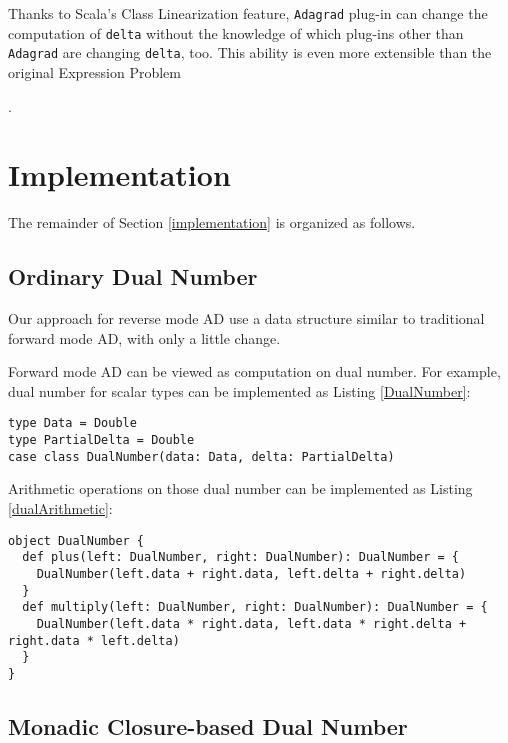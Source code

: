 Thanks to Scala's Class Linearization \cite{odersky2017scala} feature, \lstinline{Adagrad} \gls{plug-in} can change the computation of \lstinline{delta} without the knowledge of which \glspl{plug-in} other than \lstinline{Adagrad} are changing \lstinline{delta}, too. This ability is even more extensible than the original Expression Problem\begin{anonsuppress} \cite{yang2017expression}
\end{anonsuppress}
.

\section{Implementation\label{implementation}}

The remainder of Section \ref{implementation} is organized as follows.

\subsection{Ordinary Dual Number}

Our approach for reverse mode AD use a data structure similar to traditional forward mode AD, with only a little change.

Forward mode AD can be viewed as computation on dual number. For example, dual number for scalar types can be implemented as Listing \ref{DualNumber}:

\begin{lstlisting}[float={htbp},caption={Dual number for forward mode AD}, label={DualNumber}]
type Data = Double
type PartialDelta = Double
case class DualNumber(data: Data, delta: PartialDelta)
\end{lstlisting}

Arithmetic operations on those dual number can be implemented as Listing \ref{dualArithmetic}:

\begin{lstlisting}[float={htbp},caption={Arithmetic operations on dual number}, label={dualArithmetic}]
object DualNumber {
  def plus(left: DualNumber, right: DualNumber): DualNumber = {
    DualNumber(left.data + right.data, left.delta + right.delta)
  }
  def multiply(left: DualNumber, right: DualNumber): DualNumber = {
    DualNumber(left.data * right.data, left.data * right.delta + right.data * left.delta)
  }
}
\end{lstlisting}

\subsection{Monadic Closure-based Dual Number}

